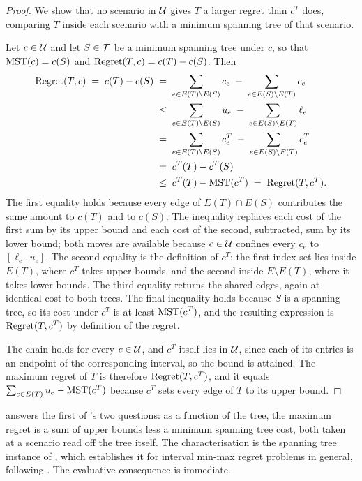 \begin{proof}
We show that no scenario in $\mathcal{U}$ gives $T$ a larger regret than $c^{T}$ does, comparing $T$ inside each scenario with a minimum spanning tree of that scenario.

Let $c \in \mathcal{U}$ and let $S \in \mathcal{T}$ be a minimum spanning tree under $c$, so that $\mathrm{MST}(c) = c(S)$ and $\operatorname{Regret}(T,c) = c(T) - c(S)$.
Then
\begin{align*}
\operatorname{Regret}(T,c) \;=\; c(T) - c(S)
&\;=\; \sum_{e \in E(T) \setminus E(S)} c_e \;-\; \sum_{e \in E(S) \setminus E(T)} c_e\\
&\;\leq\; \sum_{e \in E(T) \setminus E(S)} u_e \;-\; \sum_{e \in E(S) \setminus E(T)} \ell_e\\
&\;=\; \sum_{e \in E(T) \setminus E(S)} c^{T}_e \;-\; \sum_{e \in E(S) \setminus E(T)} c^{T}_e\\
&\;=\; c^{T}(T) - c^{T}(S)\\
&\;\leq\; c^{T}(T) - \mathrm{MST}(c^{T}) \;=\; \operatorname{Regret}(T,c^{T}).
\end{align*}
The first equality holds because every edge of $E(T) \cap E(S)$ contributes the same amount to $c(T)$ and to $c(S)$.
The inequality replaces each cost of the first sum by its upper bound and each cost of the second, subtracted, sum by its lower bound; both moves are available because $c \in \mathcal{U}$ confines every $c_e$ to $[\ell_e, u_e]$.
The second equality is the definition of $c^{T}$: the first index set lies inside $E(T)$, where $c^{T}$ takes upper bounds, and the second inside $E \setminus E(T)$, where it takes lower bounds.
The third equality returns the shared edges, again at identical cost to both trees.
The final inequality holds because $S$ is a spanning tree, so its cost under $c^{T}$ is at least $\mathrm{MST}(c^{T})$, and the resulting expression is $\operatorname{Regret}(T,c^{T})$ by definition of the regret.

The chain holds for every $c \in \mathcal{U}$, and $c^{T}$ itself lies in $\mathcal{U}$, since each of its entries is an endpoint of the corresponding interval, so the bound is attained.
The maximum regret of $T$ is therefore $\operatorname{Regret}(T,c^{T})$, and it equals $\sum_{e \in E(T)} u_e - \mathrm{MST}(c^{T})$ because $c^{T}$ sets every edge of $T$ to its upper bound.
\end{proof}

 answers the first of 's two questions: as a function of the tree, the maximum regret is a sum of upper bounds less a minimum spanning tree cost, both taken at a scenario read off the tree itself.
The characterisation is the spanning tree instance of \cite[Theorem~4.12]{Goerigk2021RCO}, which establishes it for interval min-max regret problems in general, following \textcite{AissiBazganVanderpooten2009Survey}.
The evaluative consequence is immediate.

